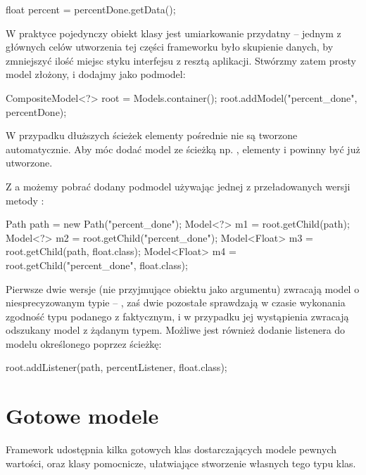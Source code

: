 \begin{java}
float percent = percentDone.getData();
\end{java}

W praktyce pojedynczy obiekt klasy  jest umiarkowanie przydatny -- jednym z głównych
celów utworzenia tej części frameworku było skupienie danych, by zmniejszyć ilość miejsc styku
interfejsu z resztą aplikacji. Stwórzmy zatem prosty model złożony, i dodajmy 
jako podmodel:

\begin{java}
CompositeModel<?> root = Models.container();
root.addModel("percent_done", percentDone);
\end{java}

\begin{Caution}
W przypadku dłuższych ścieżek elementy pośrednie nie są tworzone automatycznie. Aby móc dodać model
ze ścieżką np. , elementy  i  powinny być już
utworzone.  
\end{Caution}

Z a możemy pobrać dodany podmodel używając jednej z przeładowanych wersji metody
:

\begin{java}
Path path = new Path("percent_done");
Model<?> m1 = root.getChild(path);
Model<?> m2 = root.getChild("percent_done");
Model<Float> m3 = root.getChild(path, float.class);
Model<Float> m4 = root.getChild("percent_done", float.class);
\end{java}

Pierwsze dwie wersje (nie przyjmujące obiektu  jako argumentu) zwracają model o
niesprecyzowanym typie -- , zaś dwie pozostałe sprawdzają w czasie wykonania zgodność typu
podanego z faktycznym, i w przypadku jej wystąpienia zwracają odszukany model z żądanym typem.
Możliwe jest również dodanie listenera do modelu określonego poprzez ścieżkę:

\begin{java}
root.addListener(path, percentListener, float.class);
\end{java}


\section{Gotowe modele}
\label{Modele}

Framework udostępnia kilka gotowych klas dostarczających modele pewnych wartości, oraz klasy
pomocnicze, ułatwiające stworzenie własnych tego typu klas.

